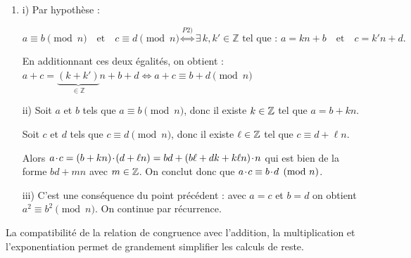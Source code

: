 \begin{enumerate}
  \item i) Par hypothèse :
  
  $$a \equiv b  \pmod n \quad \text{et} \quad c \equiv d  \pmod n \overset{P2)}{\iff} \exists\, k, k' \in \mathbb{Z} \text{ tel que : } a = kn + b \quad \text{et} \quad c = k'n + d .$$
  
  \indent En additionnant ces deux égalités, on obtient :  
  $a + c = \underbrace{(k + k')}_{\in \mathbb{Z}} n + b + d \iff a + c \equiv b + d  \pmod n$\\
  
  \smallskip
  
  ii) Soit $a$ et $b$ tels que $a \equiv b \pmod n$, donc il existe $k \in \mathbb{Z}$ tel que $a=b + kn$.
  
   \indent Soit $c$ et $d$ tels que $c \equiv d \pmod n$, donc il existe $\ell \in \mathbb{Z}$ tel que $c \equiv d + \ell n$.
   
 \indent \indent Alors $a\hspace*{-0.5mm}\cdot\hspace*{-0.5mm} c = (b+kn)\hspace*{-0.5mm}\cdot\hspace*{-0.5mm}(d+\ell n) = bd + (b \ell + d k + k\ell n)\hspace*{-0.5mm}\cdot\hspace*{-0.5mm} n$ qui est bien de la forme
$bd + m n$ avec $m\in \mathbb{Z}$. On conclut donc que  $a\hspace*{-0.5mm}\cdot\hspace*{-0.5mm} c \equiv b\hspace*{-0.5mm}\cdot\hspace*{-0.5mm} d \pmod n$.

   \smallskip
    iii) C'est une conséquence du point précédent : avec $a=c$ et $b=d$ on obtient
$a^2 \equiv b^2 \pmod n$. On continue par récurrence.
\end{enumerate}

\vspace{5mm}

La compatibilité de la relation de congruence avec l'addition, la multiplication et l’exponentiation permet de grandement simplifier les calculs de reste.

\vspace{5mm}

